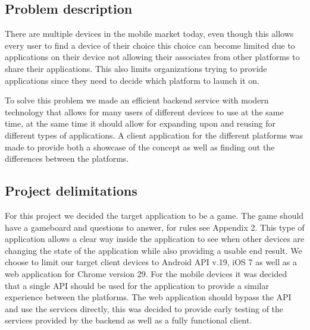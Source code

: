 \subsection{Problem description}
There are multiple devices in the mobile market today, even though this allows every user to find a device of their choice this choice can become limited due to applications on their device not allowing their associates from other platforms to share their applications. This also limits organizations trying to provide applications since they need to decide which platform to launch it on.

To solve this problem we made an efficient backend service with modern technology that allows for many users of different devices to use at the same time, at the same time it should allow for expanding upon and reusing for different types of applications. A client application for the different platforms was made to provide both a showcase of the concept as well as finding out the differences between the platforms.


\subsection{Project delimitations}
For this project we decided the target application to be a game. The game should have a gameboard and questions to answer, for rules see Appendix 2. This type of application allows a clear way inside the application to see when other devices are changing the state of the application while also providing a usable end result. We choose to limit our target client devices to Android API v.19, iOS 7 as well as a web application for Chrome version 29. For the mobile devices it was decided that a single API should be used for the application to provide a similar experience between the platforms. The web application should bypass the API and use the services directly, this was decided to provide early testing of the services provided by the backend as well as a fully functional client.


